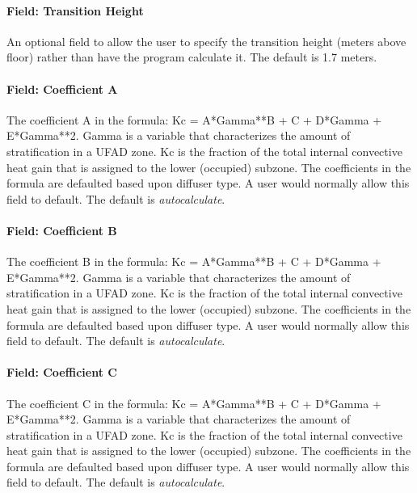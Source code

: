 \paragraph{Field: Transition Height}\label{field-transition-height-1}

An optional field to allow the user to specify the transition height (meters above floor) rather than have the program calculate it. The default is 1.7 meters.

\paragraph{Field: Coefficient A}\label{field-coefficient-a-1}

The coefficient A in the formula: Kc = A*Gamma**B + C + D*Gamma + E*Gamma**2. Gamma is a variable that characterizes the amount of stratification in a UFAD zone. Kc is the fraction of the total internal convective heat gain that is assigned to the lower (occupied) subzone. The coefficients in the formula are defaulted based upon diffuser type. A user would normally allow this field to default. The default is \emph{autocalculate}.

\paragraph{Field: Coefficient B}\label{field-coefficient-b-1}

The coefficient B in the formula: Kc = A*Gamma**B + C + D*Gamma + E*Gamma**2. Gamma is a variable that characterizes the amount of stratification in a UFAD zone. Kc is the fraction of the total internal convective heat gain that is assigned to the lower (occupied) subzone. The coefficients in the formula are defaulted based upon diffuser type. A user would normally allow this field to default. The default is \emph{autocalculate}.

\paragraph{Field: Coefficient C}\label{field-coefficient-c-1}

The coefficient C in the formula: Kc = A*Gamma**B + C + D*Gamma + E*Gamma**2. Gamma is a variable that characterizes the amount of stratification in a UFAD zone. Kc is the fraction of the total internal convective heat gain that is assigned to the lower (occupied) subzone. The coefficients in the formula are defaulted based upon diffuser type. A user would normally allow this field to default. The default is \emph{autocalculate}.

